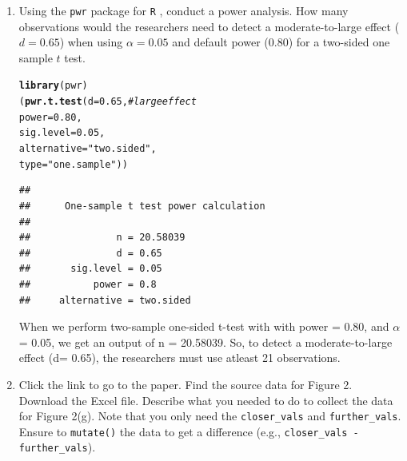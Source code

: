 \documentclass{article}\usepackage[]{graphicx}\usepackage[]{xcolor}
\makeatletter
\newcommand{\hlnum}[1]{\textcolor[rgb]{0.686,0.059,0.569}{#1}}%
\newcommand{\hlsng}[1]{\textcolor[rgb]{0.192,0.494,0.8}{#1}}%
\newcommand{\hlcom}[1]{\textcolor[rgb]{0.678,0.584,0.686}{\textit{#1}}}%
\newcommand{\hldef}[1]{\textcolor[rgb]{0.345,0.345,0.345}{#1}}%
\newcommand{\hlkwc}[1]{\textcolor[rgb]{0.333,0.667,0.333}{#1}}%
\newcommand{\hlkwd}[1]{\textcolor[rgb]{0.737,0.353,0.396}{\textbf{#1}}}%
\newenvironment{kframe}{%
 \def\at@end@of@kframe{}%
 \ifinner\ifhmode%
  \def\at@end@of@kframe{\end{minipage}}%
  \begin{minipage}{\columnwidth}%
 \fi\fi%
 \def\FrameCommand##1{\hskip\@totalleftmargin \hskip-\fboxsep
 \colorbox{shadecolor}{##1}\hskip-\fboxsep
     \hskip-\linewidth \hskip-\@totalleftmargin \hskip\columnwidth}%
 \MakeFramed {\advance\hsize-\width
   \@totalleftmargin\z@ \linewidth\hsize
   \@setminipage}}%
 {\par\unskip\endMakeFramed%
 \at@end@of@kframe}
\newenvironment{knitrout}{}{} %
\makeatother
\begin{document}
\begin{enumerate}
\item Using the \texttt{pwr} package for \texttt{R} \citep{pwr},
conduct a power analysis. How many observations would the researchers 
need to detect a moderate-to-large effect ($d=0.65$) when using 
$\alpha=0.05$ and default power (0.80) for a two-sided one sample 
$t$ test.
\begin{knitrout}
\color{fgcolor}\begin{kframe}
\begin{alltt}
\hlkwd{library}\hldef{(pwr)}
\hldef{(}\hlkwd{pwr.t.test}\hldef{(}\hlkwc{d} \hldef{=} \hlnum{0.65}\hldef{,} \hlcom{# large effect}
           \hlkwc{power} \hldef{=} \hlnum{0.80}\hldef{,}
           \hlkwc{sig.level} \hldef{=} \hlnum{0.05}\hldef{,}
           \hlkwc{alternative} \hldef{=} \hlsng{"two.sided"}\hldef{,}
           \hlkwc{type} \hldef{=} \hlsng{"one.sample"}\hldef{))}
\end{alltt}
\begin{verbatim}
## 
##      One-sample t test power calculation 
## 
##               n = 20.58039
##               d = 0.65
##       sig.level = 0.05
##           power = 0.8
##     alternative = two.sided
\end{verbatim}
\end{kframe}
\end{knitrout}
When we perform two-sample one-sided t-test with with power = 0.80,
and $\alpha$ = 0.05, we get an output of n = 20.58039. 
So, to detect a moderate-to-large effect (d= 0.65), the researchers
must use atleast 21 observations.
\item Click the link to go to the paper. Find the source data for 
Figure 2. Download the Excel file. Describe what you needed to
do to collect the data for Figure 2(g). Note that you only need the 
\texttt{closer\_vals} and \texttt{further\_vals}. Ensure to 
\texttt{mutate()} the data to get a difference 
(e.g., \texttt{closer\_vals - further\_vals}).


\end{enumerate}
\end{document}
